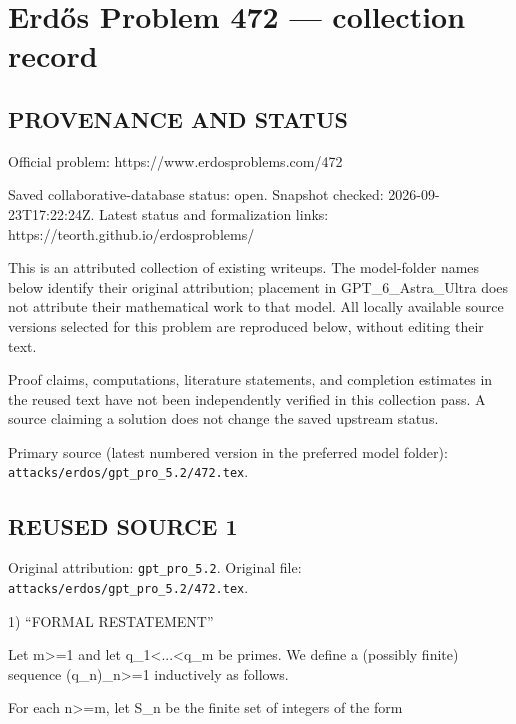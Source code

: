 \section*{Erd\H{o}s Problem 472 --- collection record}

\subsection*{PROVENANCE AND STATUS}
Official problem: https://www.erdosproblems.com/472

Saved collaborative-database status: open.
Snapshot checked: 2026-09-23T17:22:24Z.
Latest status and formalization links: https://teorth.github.io/erdosproblems/

This is an attributed collection of existing writeups. The model-folder names below identify their original attribution; placement in GPT\_6\_Astra\_Ultra does not attribute their mathematical work to that model. All locally available source versions selected for this problem are reproduced below, without editing their text.

Proof claims, computations, literature statements, and completion estimates in the reused text have not been independently verified in this collection pass. A source claiming a solution does not change the saved upstream status.

Primary source (latest numbered version in the preferred model folder): \texttt{attacks/erdos/gpt\_pro\_5.2/472.tex}.

\subsection*{REUSED SOURCE 1}
Original attribution: \texttt{gpt\_pro\_5.2}.
Original file: \texttt{attacks/erdos/gpt\_pro\_5.2/472.tex}.


1) “FORMAL RESTATEMENT”

Let m>=1 and let q_1<...<q_m be primes. We define a (possibly finite) sequence (q_n)_{n>=1} inductively as follows.

For each n>=m, let S_n be the finite set of integers of the form

